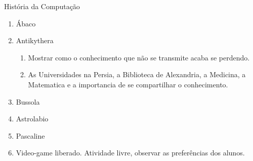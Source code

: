 {\Large História da Computação}
\begin{enumerate}
	\item Ábaco
	\item Antikythera
	\begin{enumerate}
		\item Mostrar como o conhecimento que não se transmite acaba se perdendo.
		\item As Universidades na Persia, a Biblioteca de Alexandria, a Medicina, a Matematica e a importancia de se compartilhar o conhecimento.
	\end{enumerate}
	\item Bussola
	\item Astrolabio
	\item Pascaline
	\item Video-game liberado. Atividade livre, observar as preferências dos alunos.
\end{enumerate}
